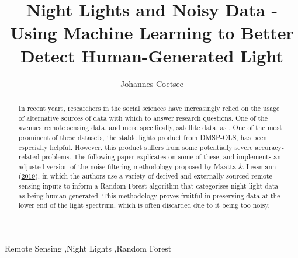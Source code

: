 \documentclass[11pt,preprint, authoryear]{elsarticle}
\numberwithin{equation}{section}
\numberwithin{figure}{section}
\numberwithin{table}{section}
\begin{document}
\begin{frontmatter}  %

\title{Night Lights and Noisy Data - Using Machine Learning to Better
Detect Human-Generated Light}





\author[Add1]{Johannes Coetsee}





\address[Add1]{Stellenbosch University}


\begin{abstract}
\small{
In recent years, researchers in the social sciences have increasingly
relied on the usage of alternative sources of data with which to answer
research questions. One of the avenues remote sensing data, and more
specifically, satellite data, as . One of the most prominent of these
datasets, the stable lights product from DMSP-OLS, has been especially
helpful. However, this product suffers from some potentially severe
accuracy-related problems. The following paper explicates on some of
these, and implements an adjusted version of the noise-filtering
methodology proposed by Määttä \& Lessmann
(\protect\hyperlink{ref-maatta}{2019}), in which the authors use a
variety of derived and externally sourced remote sensing inputs to
inform a Random Forest algorithm that categorises night-light data as
being human-generated. This methodology proves fruitful in preserving
data at the lower end of the light spectrum, which is often discarded
due to it being too noisy.
}
\end{abstract}

\vspace{1cm}

\begin{keyword}
\footnotesize{
Remote Sensing \sep Night Lights \sep Random Forest \\ \vspace{0.3cm}
}
\end{keyword}
\vspace{0.5cm}
\end{frontmatter}



\pagestyle{fancy}
\chead{}
\lfoot{}
\lhead{}
\cfoot{}
\end{document}
